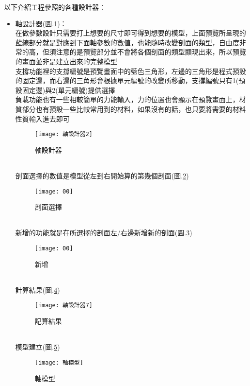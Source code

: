 以下介紹工程參照的各種設計器：
\begin{itemize}
	\item 軸設計器(圖.\ref{軸設計器})：\\
		在做參數設計只需要打上想要的尺寸即可得到想要的模型，上面預覽所呈現的藍線部分就是對應到下面軸參數的數值，也能隨時改變剖面的類型，自由度非常的高，但須注意的是預覽部分並不會將各個剖面的類型顯現出來，所以預覽的畫面並非是建立出來的完整模型\\

		支撐功能裡的支撐編號是預覽畫面中的藍色三角形，左邊的三角形是程式預設的固定邊，而右邊的三角形會根據單元編號的改變所移動，支撐編號只有1(預設固定邊)與2(單元編號)提供選擇\\

		負載功能也有一些相較簡單的力能輸入，力的位置也會顯示在預覽畫面上，材質部分也有預設一些比較常用到的材料，如果沒有的話，也只要將需要的材料性質輸入進去即可\\
		\begin{figure}[hbt!]
		\begin{center}
		\texttt{[image: 軸設計器2]}
		\caption{\Large 軸設計器}\label{軸設計器}
		\end{center}
		\end{figure}
		\\
		剖面選擇的數值是模型從左到右開始算的第幾個剖面(圖.\ref{剖面選擇})
		\begin{figure}[hbt!]
		\begin{center}
		\texttt{[image: 00]}
		\caption{\Large 剖面選擇}\label{剖面選擇}
		\end{center}
		\end{figure}
		\\
		新增的功能就是在所選擇的剖面左/右邊新增新的剖面(圖.\ref{2.8})\\
		\begin{figure}[hbt!]
		\begin{center}
		\texttt{[image: 00]}
		\caption{\Large 新增}\label{2.8}
		\end{center}
		\end{figure}
		\\
		計算結果(圖.\ref{2.9})
		\begin{figure}[hbt!]
		\begin{center}
		\texttt{[image: 軸設計器7]}
		\caption{\Large 記算結果}\label{2.9}
		\end{center}
		\end{figure}
		\\
		模型建立(圖.\ref{2.10})
		\begin{figure}[hbt!]
		\begin{center}
		\texttt{[image: 軸模型]}
		\caption{\Large 軸模型}\label{2.10}
		\end{center}
		\end{figure}
		\\
		

\end{itemize}
